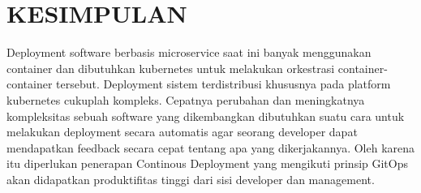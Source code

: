 \chapter{KESIMPULAN}

%
\vspace{4.5pt}
Deployment software berbasis microservice saat ini banyak menggunakan
container dan dibutuhkan kubernetes untuk melakukan orkestrasi container-container tersebut.
Deployment sistem terdistribusi khususnya pada platform kubernetes cukuplah kompleks.
Cepatnya perubahan dan meningkatnya  kompleksitas sebuah software yang dikembangkan dibutuhkan
suatu cara untuk  melakukan deployment secara automatis agar seorang developer dapat  mendapatkan
feedback secara cepat tentang apa yang dikerjakannya.
Oleh karena itu diperlukan penerapan Continous Deployment yang mengikuti prinsip GitOps akan didapatkan produktifitas tinggi dari sisi developer dan management.